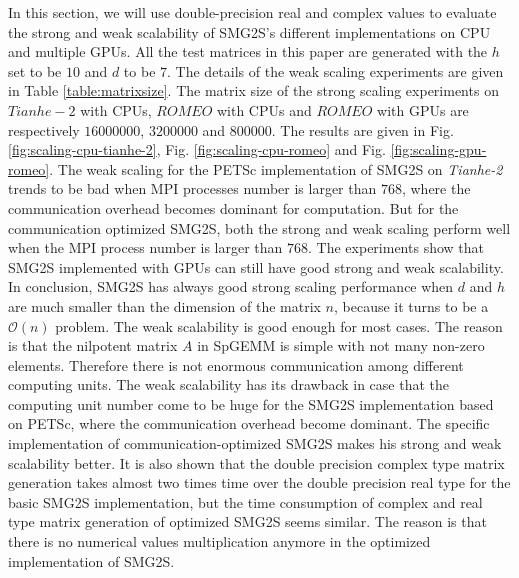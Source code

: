 In this section, we will use double-precision real and complex values to evaluate the strong and weak scalability of SMG2S's different implementations on CPU and multiple GPUs. All the test matrices in this paper are generated with the $h$ set to be $10$  and $d$ to be $7$. The details of the weak scaling experiments are given in Table \ref{table:matrixsize}. The matrix size of the strong scaling experiments on $Tianhe-2$ with CPUs, $ROMEO$ with CPUs and $ROMEO$ with GPUs are respectively $\num[round-precision=2,round-mode=figures]{16000000}$, $\num[round-precision=2,round-mode=figures]{3200000}$ and $\num[round-precision=2,round-mode=figures]{800000}$. The results are given in Fig. \ref{fig:scaling-cpu-tianhe-2}, Fig. \ref{fig:scaling-cpu-romeo} and Fig. \ref{fig:scaling-gpu-romeo}. The weak scaling for the PETSc implementation of SMG2S on \textit{Tianhe-2} trends to be bad when MPI processes number is larger than $768$, where the communication overhead becomes dominant for computation. But for the communication optimized SMG2S, both the strong and weak scaling perform well when the MPI process number is larger than $768$. The experiments show that SMG2S implemented with GPUs can still have good strong and weak scalability. In conclusion, SMG2S has always good strong scaling performance when $d$ and $h$ are much smaller than the dimension of the matrix $n$, because it turns to be a $\mathcal{O}(n)$ problem. The weak scalability is good enough for most cases. The reason is that the nilpotent matrix $A$ in SpGEMM is simple with not many non-zero elements. Therefore there is not enormous communication among different computing units. The weak scalability has its drawback in case that the computing unit number come to be huge for the SMG2S implementation based on PETSc, where the communication overhead become dominant. The specific implementation of communication-optimized SMG2S makes his strong and weak scalability better. It is also shown that the double precision complex type matrix generation takes almost two times time over the double precision real type for the basic SMG2S implementation, but the time consumption of complex and real type matrix generation of optimized SMG2S seems similar. The reason is that there is no numerical values multiplication anymore in the optimized implementation of SMG2S. 

